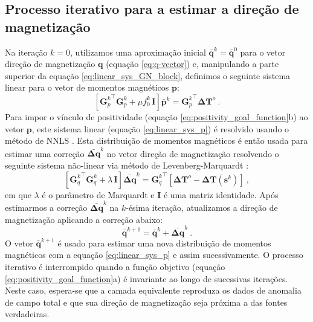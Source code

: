\subsection{Processo iterativo para a estimar a direção de magnetização}
\label{subsec:iterative-proccess}

Na iteração $k=0$, utilizamos uma aproximação inicial $\bar{\mathbf{q}}^{k} = \bar{\mathbf{q}}^{0}$ 
para o vetor direção de magnetização $\mathbf{q}$ (equação \ref{eq:q-vector}) e, manipulando a 
parte superior da equação \ref{eq:linear_sys_GN_block}, definimos o seguinte sistema linear 
para o vetor de momentos magnéticos $\mathbf{p}$:
\begin{equation}
\left[ {\mathbf{G}_{p}^{k}}^{\top} \mathbf{G}_{p}^{k} + 
\mu f_{0}^{k} \, \mathbf{I} \right] \bar{\mathbf{p}}^{k} = 
{\mathbf{G}_{p}^{k}}^{\top} \mathbf{\Delta T}^{o} \: .
\label{eq:linear_sys_p}
\end{equation}
Para impor o vínculo de positividade (equação \ref{eq:positivity_goal_function}b) ao vetor $\mathbf{p}$, este sistema 
linear (equação \ref{eq:linear_sys_p}) é resolvido usando o método de NNLS \citep{lawson_hanson_1974, silvadias_etal_2007}. 
Esta distribuição de momentos magnéticos é então usada para estimar uma correção $\bar{\mathbf{\Delta q}}^{k}$ no vetor 
direção de magnetização resolvendo o seguinte sistema não-linear via método de Levenberg-Marquardt 
\citep{aster2005}:
\begin{equation}
\left[ {\mathbf{G}_{q}^{k}}^{\top} \mathbf{G}_{q}^{k} + \lambda \, \mathbf{I} \right] 
\bar{\mathbf{\Delta q}}^{k} = {\mathbf{G}_{q}^{k}}^{\top} 
\left[ \mathbf{\Delta T}^{o} - \mathbf{\Delta T} (\mathbf{s}^{k}) \right] \: ,
\label{eq:linear_sys_q}
\end{equation}
em que $\lambda$ é o parâmetro de Marquardt e $\mathbf{I}$ é uma matriz identidade. Após estimarmos a correção 
$\bar{\mathbf{\Delta q}}^{k}$ na $k$-ésima iteração, atualizamos a direção de magnetização 
aplicando a correção abaixo:
\begin{equation}
\bar{\mathbf{q}}^{k+1} = \bar{\mathbf{q}}^{k} + \bar{\mathbf{\Delta q}}^{k} \: .
\label{eq:q_next}
\end{equation}
O vetor $\bar{\mathbf{q}}^{k+1}$ é usado para estimar uma nova distribuição de momentos magnéticos com a equação 
\ref{eq:linear_sys_p} e assim sucessivamente. O processo iterativo é interrompido quando a função objetivo 
(equação \ref{eq:positivity_goal_function}a) é invariante ao longo de sucessivas iterações. Neste 
caso, espera-se que a camada equivalente reproduza os dados de anomalia de campo total e 
que sua direção de magnetização seja próxima a das fontes verdadeiras.

